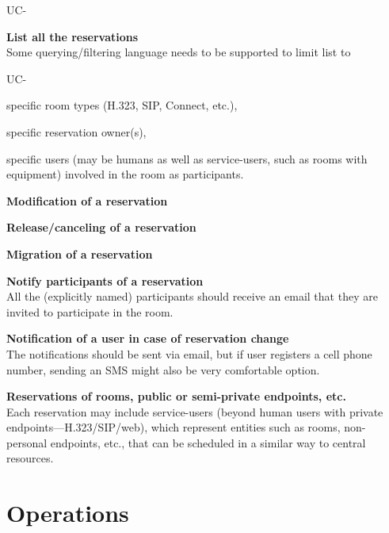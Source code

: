 \documentclass[a4paper]{report}
\makeatletter
\newcounter{UCcounter}
\newenvironment{UseCases}%
	{\begin{list}{UC-\arabic{UCcounter}}{\@nmbrlisttrue\def\@listctr{UCcounter}}}%
	{\end{list}}
\newcommand{\UClabel}[1]{\label{UC:#1}}
\newcommand{\UseCase}[2]{\item\UClabel{#2} \textbf{#1}\\}
\makeatother
\begin{document}
\begin{UseCases}
\UseCase{List all the reservations}{srv:list}

Some querying/filtering language needs to be supported to limit list to

\begin{UseCases}

\item specific room types (H.323, SIP, Connect, etc.),

\item specific reservation owner(s),

\item specific users (may be humans as well as service-users, such as rooms
with equipment) involved in the room as participants.

\end{UseCases}

\UseCase{Modification of a reservation}{rsv:modify}

\UseCase{Release/canceling of a reservation}{rsv:release}

\UseCase{Migration of a reservation}{rsv:migration}

\UseCase{Notify participants of a reservation}{rsv:notify-rsv}

All the (explicitly named) participants should receive an email that they are invited to participate in the room.

\UseCase{Notification of a user in case of reservation
change}{rsv:notify-change}

The notifications should be sent via email, but if user registers a cell phone
number, sending an SMS might also be very comfortable option.

\UseCase{Reservations of rooms, public or semi-private endpoints,
etc.}{rsv:service-users}

Each reservation may include service-users (beyond human users with private
endpoints---H.323/SIP/web), which represent entities such as rooms,
non-personal endpoints, etc., that can be scheduled in a similar way to central
resources.

\end{UseCases}


\section{Operations}
\end{document}
